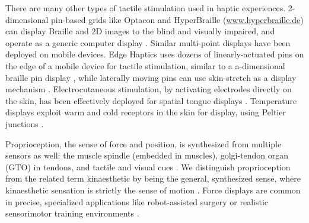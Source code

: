 There are many other types of tactile stimulation used in haptic experiences.
2-dimensional pin-based grids like Optacon \cite{Bliss1970} and HyperBraille (\url{www.hyperbraille.de}) can display Braille and 2D images to the blind and visually impaired, and operate as a generic computer display \cite{Prescher2010}. 
Similar multi-point displays have been deployed on mobile devices.
Edge Haptics uses dozens of linearly-actuated pins on the edge of a mobile device for tactile stimulation, similar to a a-dimensional braille pin display \cite{Jang2016}, while laterally moving pins can use skin-stretch as a display mechanism \cite{Luk2006}.
Electrocutaneous stimulation, by activating electrodes directly on the skin, has been effectively deployed for spatial tongue displays \cite{Bach-y-Rita1998}.
Temperature displays exploit warm and cold receptors in the skin for display, using Peltier junctions \cite{Jones2002}.



Proprioception, the sense of force and position, is synthesized from multiple sensors as well: the muscle spindle (embedded in muscles), golgi-tendon organ (GTO) in tendons, and tactile and visual cues \cite{Kandel2000}.
We distinguish proprioception from the related term kinaesthetic by being the general, synthesized sense, where kinaesthetic sensation is strictly the sense of motion .
Force displays are common in precise, specialized applications like robot-assisted surgery \cite{Okamura2009} or realistic sensorimotor training environments \cite{VanDerMeijden2009}.

